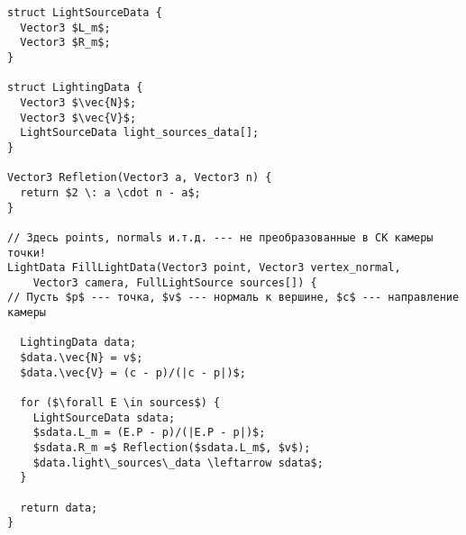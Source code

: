 \documentclass[a4paper,12pt]{report}
\numberwithin{equation}{section}
\begin{document}
\begin{lstlisting}[float=!h,caption={Нахождение векторов для освещения по Фонгу},label=lighting_vectors_algo]
struct LightSourceData {
  Vector3 $L_m$;
  Vector3 $R_m$;
}

struct LightingData {
  Vector3 $\vec{N}$;
  Vector3 $\vec{V}$;
  LightSourceData light_sources_data[];
}

Vector3 Refletion(Vector3 a, Vector3 n) {
  return $2 \: a \cdot n - a$;
}

// Здесь points, normals и.т.д. --- не преобразованные в СК камеры точки!
LightData FillLightData(Vector3 point, Vector3 vertex_normal,
    Vector3 camera, FullLightSource sources[]) {
// Пусть $p$ --- точка, $v$ --- нормаль к вершине, $c$ --- направление камеры

  LightingData data;
  $data.\vec{N} = v$;
  $data.\vec{V} = (c - p)/(|c - p|)$;
  
  for ($\forall E \in sources$) {
    LightSourceData sdata;
    $sdata.L_m = (E.P - p)/(|E.P - p|)$;
    $sdata.R_m =$ Reflection($sdata.L_m$, $v$);
    $data.light\_sources\_data \leftarrow sdata$;
  }
  
  return data;
}
\end{lstlisting}
\end{document}
